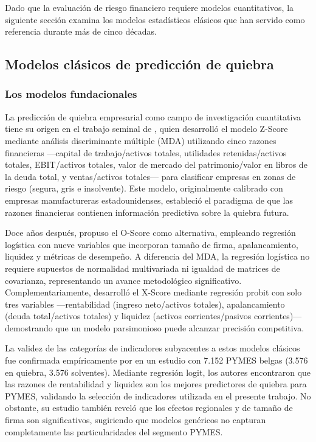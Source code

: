 \documentclass[12pt, letterpaper]{article}
\begin{document}
Dado que la evaluaci\'on de riesgo financiero requiere modelos cuantitativos, la siguiente secci\'on examina los modelos estad\'isticos cl\'asicos que han servido como referencia durante m\'as de cinco d\'ecadas.

\subsection{Modelos cl\'asicos de predicci\'on de quiebra}
\label{sec:clasicos}

\subsubsection{Los modelos fundacionales}

La predicci\'on de quiebra empresarial como campo de investigaci\'on cuantitativa tiene su origen en el trabajo seminal de \citet{Altman1968}, quien desarroll\'o el modelo Z-Score mediante an\'alisis discriminante m\'ultiple (MDA) utilizando cinco razones financieras ---capital de trabajo/activos totales, utilidades retenidas/activos totales, EBIT/activos totales, valor de mercado del patrimonio/valor en libros de la deuda total, y ventas/activos totales--- para clasificar empresas en zonas de riesgo (segura, gris e insolvente). Este modelo, originalmente calibrado con empresas manufactureras estadounidenses, estableci\'o el paradigma de que las razones financieras contienen informaci\'on predictiva sobre la quiebra futura.

Doce a\~nos despu\'es, \citet{Ohlson1980} propuso el O-Score como alternativa, empleando regresi\'on log\'istica con nueve variables que incorporan tama\~no de firma, apalancamiento, liquidez y m\'etricas de desempe\~no. A diferencia del MDA, la regresi\'on log\'istica no requiere supuestos de normalidad multivariada ni igualdad de matrices de covarianza, representando un avance metodol\'ogico significativo. Complementariamente, \citet{Zmijewski1984} desarroll\'o el X-Score mediante regresi\'on probit con solo tres variables ---rentabilidad (ingreso neto/activos totales), apalancamiento (deuda total/activos totales) y liquidez (activos corrientes/pasivos corrientes)--- demostrando que un modelo parsimonioso puede alcanzar precisi\'on competitiva.

La validez de las categor\'ias de indicadores subyacentes a estos modelos cl\'asicos fue confirmada emp\'iricamente por \citet{Cultrera2016} en un estudio con 7.152 PYMES belgas (3.576 en quiebra, 3.576 solventes). Mediante regresi\'on logit, los autores encontraron que las razones de rentabilidad y liquidez son los mejores predictores de quiebra para PYMES, validando la selecci\'on de indicadores utilizada en el presente trabajo. No obstante, su estudio tambi\'en revel\'o que los efectos regionales y de tama\~no de firma son significativos, sugiriendo que modelos gen\'ericos no capturan completamente las particularidades del segmento PYMES.
\end{document}
